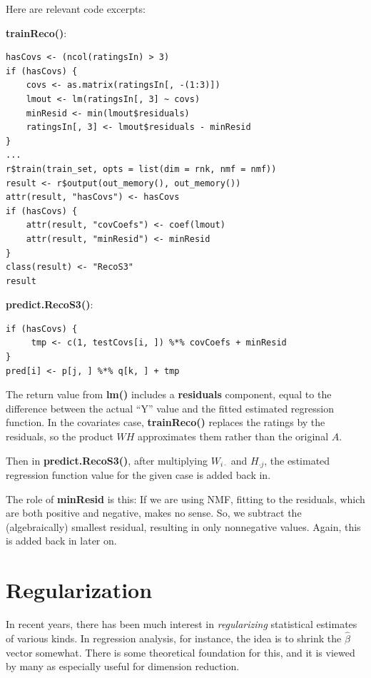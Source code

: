 Here are relevant code excerpts:

\textbf{trainReco()}:

\begin{lstlisting}
hasCovs <- (ncol(ratingsIn) > 3)
if (hasCovs) {
    covs <- as.matrix(ratingsIn[, -(1:3)])
    lmout <- lm(ratingsIn[, 3] ~ covs)
    minResid <- min(lmout$residuals)
    ratingsIn[, 3] <- lmout$residuals - minResid
}
...
r$train(train_set, opts = list(dim = rnk, nmf = nmf))
result <- r$output(out_memory(), out_memory())
attr(result, "hasCovs") <- hasCovs
if (hasCovs) {
    attr(result, "covCoefs") <- coef(lmout)
    attr(result, "minResid") <- minResid
}
class(result) <- "RecoS3"
result
\end{lstlisting}

\textbf{predict.RecoS3()}:

\begin{lstlisting}
if (hasCovs) {
     tmp <- c(1, testCovs[i, ]) %*% covCoefs + minResid
}
pred[i] <- p[j, ] %*% q[k, ] + tmp
\end{lstlisting}

The return value from \textbf{lm()} includes a \textbf{residuals}
component, equal to the difference between the actual ``Y'' value and
the fitted estimated regression function.  In the covariates case, 
\textbf{trainReco()} replaces the ratings by the residuals, so the
product $WH$ approximates them rather than the original $A$.

Then in \textbf{predict.RecoS3()}, after multiplying $W_{i \cdot}$ and
$H_{\cdot j}$, the estimated regression function value for the given
case is added back in.

The role of \textbf{minResid} is this:  If we are using NMF, fitting to the
residuals, which are both positive and negative, makes no sense.  So, we
subtract the (algebraically) smallest residual, resulting in only
nonnegative values.  Again, this is added back in later on.

\section{Regularization}

In recent years, there has been much interest in \textit{regularizing}
statistical estimates of various kinds.  In regression analysis, for
instance, the idea is to shrink the $\widehat{\beta}$ vector somewhat.
There is some theoretical foundation for this, and it is viewed by many
as especially useful for dimension reduction.


